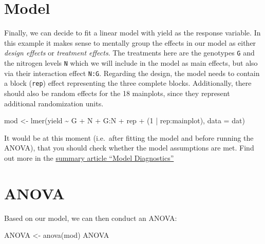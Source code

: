 \documentclass[
  letterpaper,
  DIV=11,
  numbers=noendperiod]{scrartcl}
\newenvironment{Shaded}{\begin{snugshade}}{\end{snugshade}}
\newcommand{\AttributeTok}[1]{\textcolor[rgb]{0.40,0.45,0.13}{#1}}
\newcommand{\DecValTok}[1]{\textcolor[rgb]{0.68,0.00,0.00}{#1}}
\newcommand{\FunctionTok}[1]{\textcolor[rgb]{0.28,0.35,0.67}{#1}}
\newcommand{\NormalTok}[1]{\textcolor[rgb]{0.00,0.23,0.31}{#1}}
\newcommand{\OtherTok}[1]{\textcolor[rgb]{0.00,0.23,0.31}{#1}}
\newcommand{\SpecialCharTok}[1]{\textcolor[rgb]{0.37,0.37,0.37}{#1}}
\begin{document}
\hypertarget{model}{%
\section{Model}\label{model}}

Finally, we can decide to fit a linear model with yield as the response
variable. In this example it makes sense to mentally group the effects
in our model as either \emph{design effects} or \emph{treatment
effects}. The treatments here are the genotypes \texttt{G} and the
nitrogen levels \texttt{N} which we will include in the model as main
effects, but also via their interaction effect \texttt{N:G}. Regarding
the design, the model needs to contain a block (\texttt{rep}) effect
representing the three complete blocks. Additionally, there should also
be random effects for the 18 mainplots, since they represent additional
randomization units.

\begin{Shaded}
\begin{Highlighting}[]
\NormalTok{mod }\OtherTok{\textless{}{-}} \FunctionTok{lmer}\NormalTok{(yield }\SpecialCharTok{\textasciitilde{}}\NormalTok{ G }\SpecialCharTok{+}\NormalTok{ N }\SpecialCharTok{+}\NormalTok{ G}\SpecialCharTok{:}\NormalTok{N }\SpecialCharTok{+}
\NormalTok{              rep }\SpecialCharTok{+}\NormalTok{ (}\DecValTok{1} \SpecialCharTok{|}\NormalTok{ rep}\SpecialCharTok{:}\NormalTok{mainplot),}
            \AttributeTok{data =}\NormalTok{ dat)}
\end{Highlighting}
\end{Shaded}

It would be at this moment (i.e.~after fitting the model and before
running the ANOVA), that you should check whether the model assumptions
are met. Find out more in the
\href{../../summaryarticles/modeldiagnostics.qmd}{summary article
``Model Diagnostics''}

\hypertarget{anova}{%
\section{ANOVA}\label{anova}}

Based on our model, we can then conduct an ANOVA:

\begin{Shaded}
\begin{Highlighting}[]
\NormalTok{ANOVA }\OtherTok{\textless{}{-}} \FunctionTok{anova}\NormalTok{(mod)}
\NormalTok{ANOVA}
\end{Highlighting}
\end{Shaded}
\end{document}
